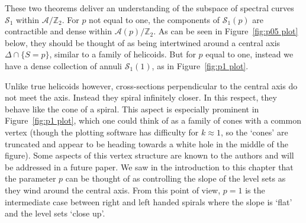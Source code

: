 \documentclass{article}
\numberwithin{equation}{section}
\numberwithin{figure}{section}
\begin{document}
These two theorems deliver an understanding of the subspace of spectral curves $\mathcal{S}_1$ within $\mathcal{A}/\mathbb{Z}_2$. 
For $p$ not equal to one, the components of $\mathcal{S}_1(p)$ are contractible and dense within $\mathcal{A}(p)/\mathbb{Z}_2$. As can be seen in Figure~\ref{fig:p05 plot} below, they should be thought of as being intertwined around a central axis $\Delta\cap\{S=p\}$, similar to a family of helicoids. But for $p$ equal to one, instead we have a dense collection of annuli $\mathcal{S}_1(1)$, as in Figure~\ref{fig:p1 plot}.

Unlike true helicoids however, cross-sections perpendicular to the central axis do not meet the axis. Instead they spiral infinitely closer. In this respect, they behave like the cone of a spiral. This aspect is especially prominent in Figure~\ref{fig:p1 plot}, which one could think of as a family of cones with a common vertex (though the plotting software has difficulty for $k\approx 1$, so the `cones' are truncated and appear to be heading towards a white hole in the middle of the figure). Some aspects of this vertex structure are known to the authors and will be addressed in a future paper.
We saw in the introduction to this chapter that the parameter $p$ can be thought of as controlling the slope of the level sets as they wind around the central axis. From this point of view, $p=1$ is the intermediate case between right and left handed spirals where the slope is `flat' and the level sets `close up'.
\end{document}
